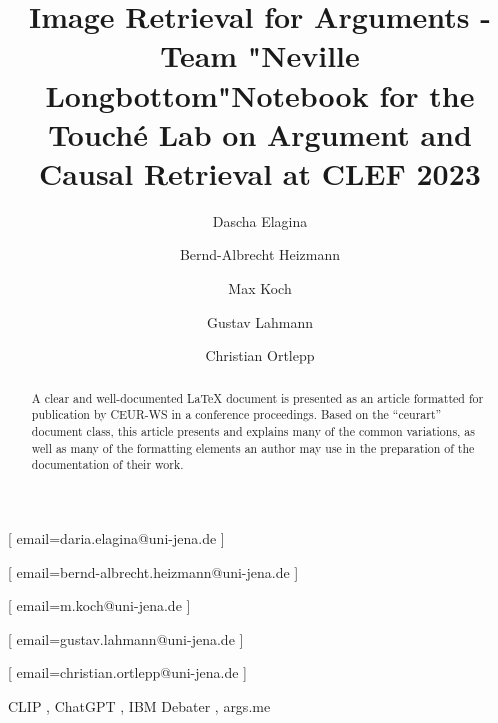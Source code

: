 \documentclass[
]{ceurart}
\begin{document}


\title{Image Retrieval for Arguments - Team "Neville Longbottom"}
\title[mode=sub]{Notebook for the Touch{\'e} Lab on Argument and Causal Retrieval at CLEF 2023}


\author[1]{Dascha Elagina}[%
email=daria.elagina@uni-jena.de
]
\author[1]{Bernd-Albrecht Heizmann}[%
email=bernd-albrecht.heizmann@uni-jena.de
]
\author[1]{Max Koch}[%
email=m.koch@uni-jena.de
]
\author[1]{Gustav Lahmann}[%
email=gustav.lahmann@uni-jena.de
]
\author[1]{Christian Ortlepp}[%
email=christian.ortlepp@uni-jena.de
]


\address[1]{Friedrich-Schiller University Jena,
07743, Jena}


\begin{abstract}
  A clear and well-documented \LaTeX{} document is presented as an
  article formatted for publication by CEUR-WS in a conference
  proceedings. Based on the ``ceurart'' document class, this article
  presents and explains many of the common variations, as well as many
  of the formatting elements an author may use in the preparation of
  the documentation of their work.
\end{abstract}

\begin{keywords}
  CLIP \sep
  ChatGPT \sep
  IBM Debater \sep
  args.me
\end{keywords}

\maketitle






\end{document}
